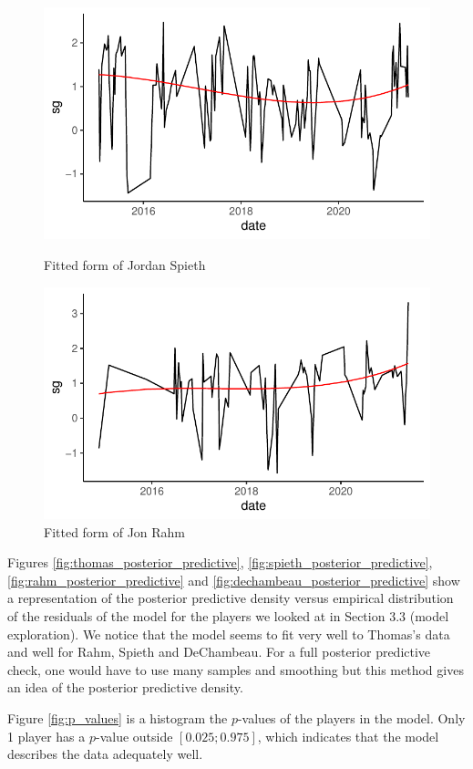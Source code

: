 \documentclass{article}\usepackage[]{graphicx}\usepackage[]{color}
\begin{document}
\begin{figure}[ht]
\begin{minipage}{0.5\textwidth}
    \centering
    \includegraphics[width=\textwidth]{Figures/spieth_fitted_form.pdf}
    \caption{Fitted form of Jordan Spieth}
    \label{fig:fitted_form_spieth}
\end{minipage}%
\begin{minipage}{0.5\textwidth}
    \centering
    \includegraphics[width=\textwidth]{Figures/rahm_fitted_form.pdf}
    \caption{Fitted form of Jon Rahm}
    \label{fig:fitted_form_rahm}
\end{minipage}
\end{figure}

Figures \ref{fig:thomas_posterior_predictive}, \ref{fig:spieth_posterior_predictive}, \ref{fig:rahm_posterior_predictive} and \ref{fig:dechambeau_posterior_predictive} show a representation of the posterior predictive density versus empirical distribution of the residuals of the model for the players we looked at in Section 3.3 (model exploration). We notice that the model seems to fit very well to Thomas's data and well for Rahm, Spieth and DeChambeau. For a full posterior predictive check, one would have to use many samples and smoothing but this method gives an idea of the posterior predictive density.
\medskip\par
Figure \ref{fig:p_values} is a histogram the $p$-values of the players in the model. Only 1 player has a $p$-value outside $[0.025;0.975]$, which indicates that the model describes the data adequately well.
\end{document}
